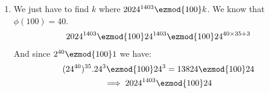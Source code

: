\begin{enumerate}[label=\textbf{(\textit{\roman*})}]
    \item 
        We just have to find $k$ where $2024^{1403} \ezmod{100} k$. We know that $\phi(100) = 40$.
        \begin{gather*}
            2024^{1403} \ezmod{100} 24^{1403} \ezmod{100} 24^{40 \times 35 + 3}
        \end{gather*}
        And since $2^{40} \ezmod{100} 1$ we have:
        \begin{gather*}
            (24^{40})^{35} . 24^3 \ezmod{100} 24^3 = 13824 \ezmod{100} 24 \\
            \implies 2024^{1403} \ezmod{100} 24
        \end{gather*}
\end{enumerate}
